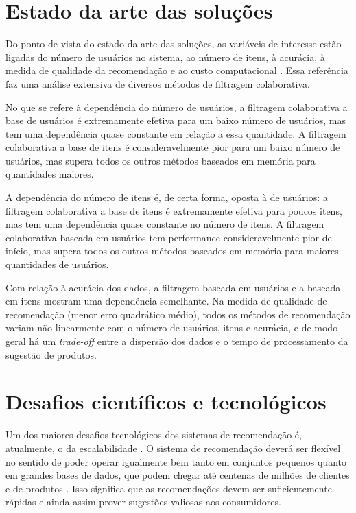 \section{Estado da arte das soluções} %
\label{sec:estado_da_arte_das_solu_es}

Do ponto de vista do estado da arte das soluções, as variáveis de interesse estão ligadas do número de usuários no sistema, ao número de itens, à acurácia, à medida de qualidade da recomendação e ao custo computacional \cite{lee2012comparative}. Essa referência faz uma análise extensiva de diversos métodos de filtragem colaborativa.

No que se refere à dependência do número de usuários, a filtragem colaborativa a base de usuários é extremamente efetiva para um baixo número de usuários, mas tem uma dependência quase constante em relação a essa quantidade. A filtragem colaborativa a base de itens é consideravelmente pior para um baixo número de usuários, mas supera todos os outros métodos baseados em memória para quantidades maiores.

A dependência do número de itens é, de certa forma, oposta à de usuários: a filtragem colaborativa a base de itens é extremamente efetiva para poucos itens, mas tem uma dependência quase constante no número de itens. A filtragem colaborativa baseada em usuários tem performance consideravelmente pior de início, mas supera todos os outros métodos baseados em memória para maiores quantidades de usuários.

Com relação à acurácia dos dados, a filtragem baseada em usuários e a baseada em itens mostram uma dependência semelhante. Na medida de qualidade de recomendação (menor erro quadrático médio), todos os métodos de recomendação variam não-linearmente com o número de usuários, itens e acurácia, e de modo geral há um \textit{trade-off} entre a dispersão dos dados e o tempo de processamento da sugestão de produtos. 

\section{Desafios científicos e tecnológicos} %
\label{sec:desafios_cient_ficos_e_tecnol_gicos}

Um dos maiores desafios tecnológicos dos sistemas de recomendação é, atualmente, o da escalabilidade \cite{wei2007survey}. O sistema de recomendação deverá ser flexível no sentido de poder operar igualmente bem tanto em conjuntos pequenos quanto em grandes bases de dados, que podem chegar até centenas de milhões de clientes \cite{amazoncustomers} e de produtos \cite{amazonproducts}. Isso significa que as recomendações devem ser suficientemente rápidas e ainda assim prover sugestões valiosas aos consumidores.

